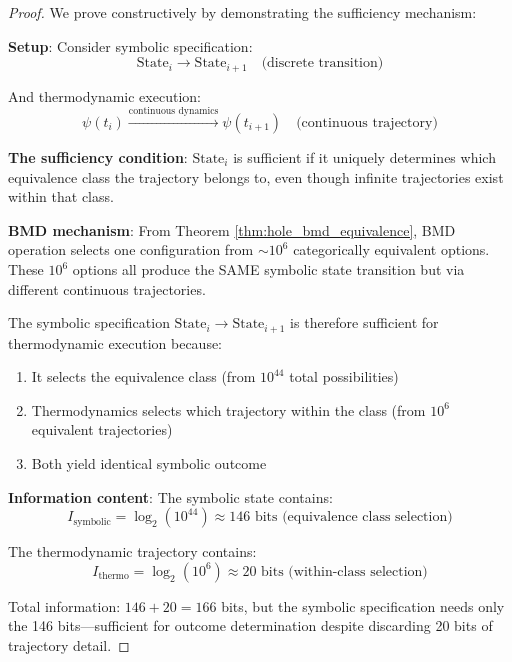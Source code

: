 \begin{proof}
We prove constructively by demonstrating the sufficiency mechanism:

\textbf{Setup}: Consider symbolic specification:
\begin{equation}
\text{State}_i \to \text{State}_{i+1} \quad \text{(discrete transition)}
\end{equation}

And thermodynamic execution:
\begin{equation}
\psi(t_i) \xrightarrow{\text{continuous dynamics}} \psi(t_{i+1}) \quad \text{(continuous trajectory)}
\end{equation}

\textbf{The sufficiency condition}: $\text{State}_i$ is sufficient if it uniquely determines which equivalence class the trajectory belongs to, even though infinite trajectories exist within that class.

\textbf{BMD mechanism}: From Theorem \ref{thm:hole_bmd_equivalence}, BMD operation selects one configuration from $\sim 10^6$ categorically equivalent options. These $10^6$ options all produce the SAME symbolic state transition but via different continuous trajectories.

The symbolic specification $\text{State}_i \to \text{State}_{i+1}$ is therefore sufficient for thermodynamic execution because:
\begin{enumerate}
\item It selects the equivalence class (from $10^{44}$ total possibilities)
\item Thermodynamics selects which trajectory within the class (from $10^6$ equivalent trajectories)
\item Both yield identical symbolic outcome
\end{enumerate}

\textbf{Information content}: The symbolic state contains:
\begin{equation}
I_{\text{symbolic}} = \log_2(10^{44}) \approx 146 \text{ bits (equivalence class selection)}
\end{equation}

The thermodynamic trajectory contains:
\begin{equation}
I_{\text{thermo}} = \log_2(10^6) \approx 20 \text{ bits (within-class selection)}
\end{equation}

Total information: $146 + 20 = 166$ bits, but the symbolic specification needs only the 146 bits—sufficient for outcome determination despite discarding 20 bits of trajectory detail.


\end{proof}
